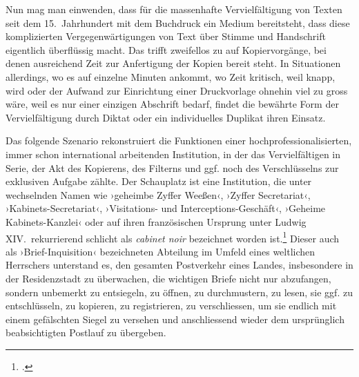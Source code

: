 \documentclass[a4paper,11pt]{article}
\newcommand{\inanf}[1]{›#1‹}
\begin{document}
Nun mag man einwenden, dass für die massenhafte Vervielfältigung von Texten seit dem 15.~Jahrhundert mit dem Buchdruck ein Medium bereitsteht, dass diese komplizierten Vergegenwärtigungen von Text über Stimme und Handschrift eigentlich überflüssig macht. Das trifft zweifellos zu auf Kopiervorgänge, bei denen ausreichend Zeit zur Anfertigung der Kopien bereit steht. In Situationen allerdings, wo es auf einzelne Minuten ankommt, wo Zeit kritisch, weil knapp, wird oder der Aufwand zur Einrichtung einer Druckvorlage ohnehin viel zu gross wäre, weil es nur einer einzigen Abschrift bedarf, findet die bewährte Form der Vervielfältigung durch Diktat oder ein individuelles Duplikat ihren Einsatz.

Das folgende Szenario rekonstruiert die Funktionen einer hochprofessionalisierten, immer schon international arbeitenden Institution, in der das Vervielfältigen in Serie, der Akt des Kopierens, des Filterns und ggf. noch des Verschlüsselns zur exklusiven Aufgabe zählte. Der Schauplatz ist eine Institution, die unter wechselnden Namen wie \inanf{geheimbe Zyffer Weeßen}, \inanf{Zyffer Secretariat}, \inanf{Kabinets-Secretariat}, \inanf{Visitations- und Interceptions-Geschäft}, \inanf{Geheime Kabinets-Kanzlei} oder auf ihren französischen Ursprung unter Ludwig XIV.\ rekurrierend schlicht als \emph{cabinet noir} bezeichnet worden ist.\footcite{leeuw:1999} Dieser auch als \inanf{Brief-Inquisition} bezeichneten Abteilung im Umfeld eines weltlichen Herrschers unterstand es, den gesamten Postverkehr eines Landes, insbesondere in der Residenzstadt zu überwachen, die wichtigen Briefe nicht nur abzufangen, sondern unbemerkt zu entsiegeln, zu öffnen, zu durchmustern, zu lesen, sie ggf. zu entschlüsseln, zu kopieren, zu registrieren, zu verschliessen, um sie endlich mit einem gefälschten Siegel zu versehen und anschliessend wieder dem ursprünglich beabsichtigten Postlauf zu übergeben. 
\end{document}

